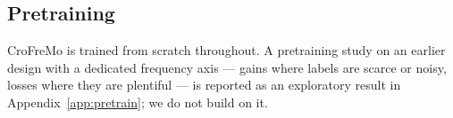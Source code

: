 \subsection{Pretraining}
\label{sec:pretrain-results}

CroFreMo is trained from scratch throughout. A pretraining study on an
earlier design with a dedicated frequency axis --- gains where labels are
scarce or noisy, losses where they are plentiful --- is reported as an
exploratory result in Appendix~\ref{app:pretrain}; we do not build on it.
